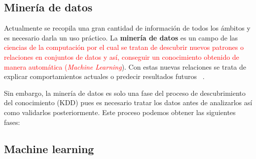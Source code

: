 \subsection{Minería de datos}
Actualmente se recopila una gran cantidad de información de todos los ámbitos y es necesario darla un uso práctico. La \textbf{minería de datos} es un campo de las \textcolor{red}{ciencias de la computación por el cual se tratan de descubrir nuevos patrones o relaciones en conjuntos de datos y así, conseguir un conocimiento obtenido de manera automática (\emph{Machine Learning}}). Con estas nuevas relaciones se trata de explicar comportamientos actuales o predecir resultados futuros~ \cite{mineria_tecnicas_herramientas}. 

Sin embargo, la minería de datos es solo una fase del proceso de descubrimiento del conocimiento (KDD) pues es necesario tratar los datos antes de analizarlos así como validarlos posteriormente. Este proceso podemos obtener las siguientes fases:


%
%
%
%

\subsection{Machine learning}








